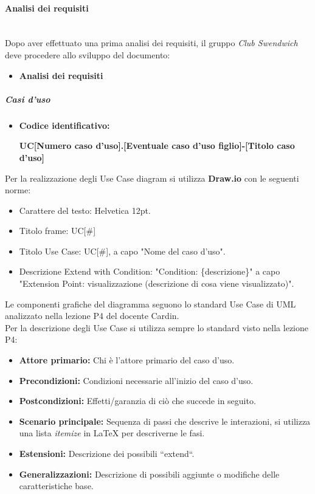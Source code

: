 \paragraph{Analisi dei requisiti}
\mbox{} \\
Dopo aver effettuato una prima analisi dei requisiti, il gruppo \textit{Club Swendwich}
deve procedere allo sviluppo del documento:
\begin{itemize}
    \item \textbf{Analisi dei requisiti}
\end{itemize}

\subparagraph{Casi d'uso}
\begin{itemize}
    \item   \textbf{Codice identificativo:}
            \par \centerline{\textbf{UC[Numero caso d'uso].[Eventuale caso d'uso figlio]-[Titolo caso d'uso]}}
\end{itemize}
Per la realizzazione degli Use Case diagram si utilizza \textbf{Draw.io} con le seguenti norme:
\begin{itemize}
\item Carattere del testo: Helvetica 12pt.
\item Titolo frame: UC[\#]
\item Titolo Use Case: UC[\#], a capo "Nome del caso d'uso".
\item Descrizione Extend with Condition: "Condition: \{descrizione\}" a capo "Extension Point: visualizzazione (descrizione di cosa viene visualizzato)".
\end{itemize}
Le componenti grafiche del diagramma seguono lo standard Use Case di UML analizzato nella lezione P4 del docente Cardin. \\

\noindent Per la descrizione degli Use Case si utilizza sempre lo standard visto nella lezione P4:
\begin{itemize}
	\item \textbf{Attore primario:} Chi è l'attore primario del caso d'uso.
	\item \textbf{Precondizioni:} Condizioni necessarie all'inizio del caso d'uso.
	\item \textbf{Postcondizioni:} Effetti/garanzia di ciò che succede in seguito.
	\item \textbf{Scenario principale:} Sequenza di passi che descrive le interazioni, si utilizza una lista \textit{itemize} in LaTeX per descriverne le fasi.
	\item \textbf{Estensioni:} Descrizione dei possibili ``extend``.
	\item \textbf{Generalizzazioni:} Descrizione di possibili aggiunte o modifiche delle caratteristiche base.
\end{itemize}


